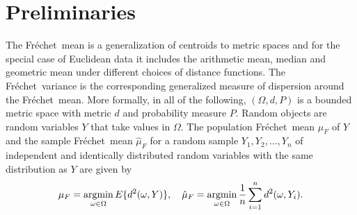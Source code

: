 \documentclass[lineno]{biometrika}
\newcommand{\no}{\noindent}
\def\O{\Omega}
\def\F{Fr\'{e}chet}
\def\hmu{\hat{\mu}_F}
\def\s1n{\sum_{i=1}^n}
\begin{document}
\section{Preliminaries}
\label{sec: prelim}
\no The \F \ mean is a generalization of centroids to metric spaces and for the special case of  Euclidean data it includes the arithmetic mean, median and geometric mean under different choices of distance functions. The \F \ variance is the corresponding  generalized measure of dispersion around the \F \ mean. More formally, in all of the following, $(\O, d, P)$ is a bounded metric space with metric $d$ and probability measure $P$. Random objects  are  random variables $Y$ that take values in $\O$.  The population \F \ mean $\mu_F$ of $Y$ and the sample \F \ mean $\hmu$ for  a random sample  $Y_1, Y_2,\dots, Y_n$ of independent and identically distributed random variables with the same distribution  as $Y$ are given by 
\begin{equation*}
\label{eq: fre_mean_pop}
\mu_F=\operatornamewithlimits{argmin}_{\omega \in \Omega}E\{d^2(\omega, Y)\}, \quad \hmu=\operatornamewithlimits{argmin}_{\omega \in \Omega} \frac{1}{n}\s1n d^2(\omega,Y_i).
\end{equation*}
\end{document}
